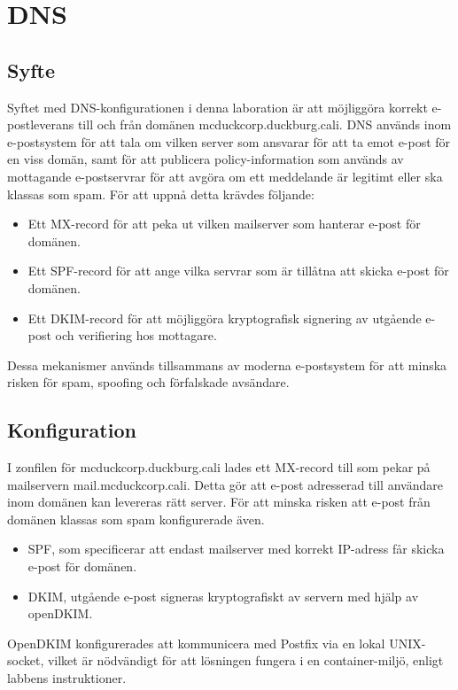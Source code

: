 \documentclass{report}
\begin{document}
\chapter*{DNS}
\setcounter{chapter}{3}
\setcounter{figure}{0}
\setcounter{section}{0}
\section{Syfte}
Syftet med DNS-konfigurationen i denna laboration är att möjliggöra korrekt e-postleverans
till och från domänen mcduckcorp.duckburg.cali. \newline
DNS används inom e-postsystem för att tala om vilken server som ansvarar för att ta emot e-post 
för en viss domän, samt för att publicera policy-information som används av mottagande e-postservrar för att avgöra
om ett meddelande är legitimt eller ska klassas som spam.
\newline\newline
För att uppnå detta krävdes följande:
\begin{itemize}
    \item Ett MX-record för att peka ut vilken mailserver som hanterar e-post för domänen.
    \item Ett SPF-record för att ange vilka servrar som är tillåtna att skicka e-post för domänen.
    \item Ett DKIM-record för att möjliggöra kryptografisk signering av utgående e-post och verifiering hos mottagare.
\end{itemize}
Dessa mekanismer används tillsammans av moderna e-postsystem för att minska risken för spam, spoofing och förfalskade avsändare.

\section{Konfiguration}
I zonfilen för mcduckcorp.duckburg.cali lades ett MX-record till som pekar på mailservern mail.mcduckcorp.cali. Detta gör att e-post adresserad
till användare inom domänen kan levereras rätt server.
\newline
För att minska risken att e-post från domänen klassas som spam konfigurerade även.
\begin{itemize}
    \item SPF, som specificerar att endast mailserver med korrekt IP-adress får skicka e-post för domänen.
    \item DKIM, utgående e-post signeras kryptografiskt av servern med hjälp av openDKIM. 
\end{itemize}
OpenDKIM konfigurerades att kommunicera med Postfix via en lokal UNIX-socket, vilket är nödvändigt för att lösningen fungera 
i en container-miljö, enligt labbens instruktioner.
\end{document}

